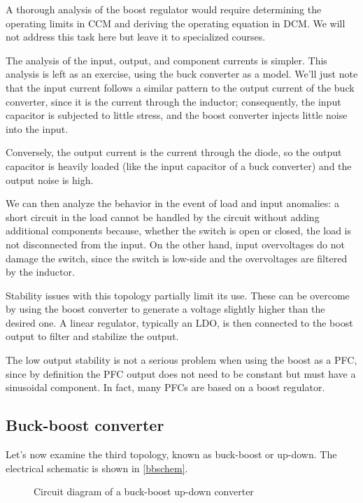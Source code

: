 \documentclass[../main.tex]{subfiles}
\begin{document}
A thorough analysis of the boost regulator would require determining the operating limits in CCM and deriving the operating equation in DCM. We will not address this task here but leave it to specialized courses.

The analysis of the input, output, and component currents is simpler. This analysis is left as an exercise, using the buck converter as a model. We’ll just note that the input current follows a similar pattern to the output current of the buck converter, since it is the current through the inductor; consequently, the input capacitor is subjected to little stress, and the boost converter injects little noise into the input.

Conversely, the output current is the current through the diode, so the output capacitor is heavily loaded (like the input capacitor of a buck converter) and the output noise is high.

We can then analyze the behavior in the event of load and input anomalies: a short circuit in the load cannot be handled by the circuit without adding additional components because, whether the switch is open or closed, the load is not disconnected from the input. On the other hand, input overvoltages do not damage the switch, since the switch is low-side and the overvoltages are filtered by the inductor.

Stability issues with this topology partially limit its use. These can be overcome by using the boost converter to generate a voltage slightly higher than the desired one. A linear regulator, typically an LDO, is then connected to the boost output to filter and stabilize the output.

The low output stability is not a serious problem when using the boost as a PFC, since by definition the PFC output does not need to be constant but must have a sinusoidal component. In fact, many PFCs are based on a boost regulator.


\subsection{Buck-boost converter}


Let's now examine the third topology, known as buck-boost or up-down. The electrical schematic is shown in \autoref{bbschem}.



\begin{figure}[h!]
\begin{center}


\label{bbschem}
\caption{Circuit diagram of a buck-boost up-down converter}	
\end{center}
\end{figure}
\end{document}

